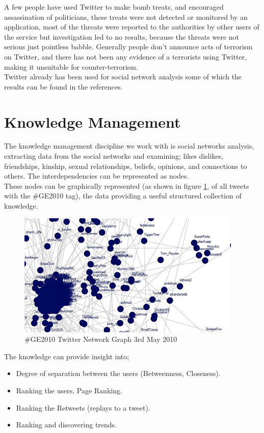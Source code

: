\documentclass[]{article}  %
\begin{document}
A few people have used Twitter to make bomb treats, and encouraged assassination of politicians, these treats were not detected or monitored by an application, most of the threats were reported to the authorities by other users of the service but investigation  led to no results, because the threats were not serious just pointless babble. Generally people don't announce acts of terrorism on Twitter, and there has not been any evidence of a terrorists using Twitter, making it unsuitable for counter-terrorism. \\ Twitter already has been used for social network analysis some of which the results can be found in the references.

\section{Knowledge Management}
The knowledge management discipline we work with is social networks analysis, extracting data from the social networks and examining; likes dislikes, friendships, kinship, sexual relationships, beliefs, opinions, and connections to others. The interdependencies can be represented as nodes. \\ These nodes can be graphically represented (as shown in figure \ref{figGraph}, of all tweets with the \#GE2010 tag), the data providing a useful structured collection of knowledge. \\ 

\begin{figure}[h]
\centering
\includegraphics[scale=1]{twitter2010.png}
\caption{\#GE2010 Twitter Network Graph 3rd May 2010}
\label{figGraph}
\end{figure}

The knowledge can provide insight into;

\begin{itemize}
	\item Degree of separation between the users (Betweenness, Closeness).
	\item Ranking the users, Page Ranking.
	\item Ranking the Retweets (replays to a tweet).
	\item Ranking and discovering trends.
\end{itemize}
\end{document}
